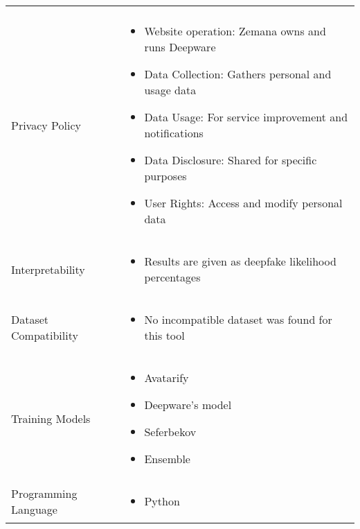 \begin{table}[htpb]
\begin{tabularx}{\textwidth}{l X}
\begin{itemize}
		                               \end{itemize}                  \\
		Privacy Policy               & \begin{itemize}[nosep,nolistsep,noitemsep]
			                               \item Website operation: Zemana owns and runs Deepware
			                               \item Data Collection: Gathers personal and usage data
			                               \item Data Usage: For service improvement and notifications
			                               \item Data Disclosure: Shared for specific purposes
			                               \item User Rights: Access and modify personal data
		                               \end{itemize} \\
		Interpretability             & \begin{itemize}[nosep,nolistsep,noitemsep]
			                               \item Results are given as deepfake likelihood percentages
		                               \end{itemize}  \\
		Dataset Compatibility        & \begin{itemize}[nosep,nolistsep,noitemsep]
			                               \item No incompatible dataset was found for this tool
		                               \end{itemize}       \\
		Training Models              & \begin{itemize}[nosep,nolistsep,noitemsep]
			                               \item Avatarify
			                               \item Deepware's model
			                               \item Seferbekov
			                               \item Ensemble
		                               \end{itemize}                  \\
		Programming Language         & \begin{itemize}[nosep,nolistsep,noitemsep]
			                               \item Python
		                               \end{itemize}                  \\
		\bottomrule
	\end{tabularx}
\end{table}


